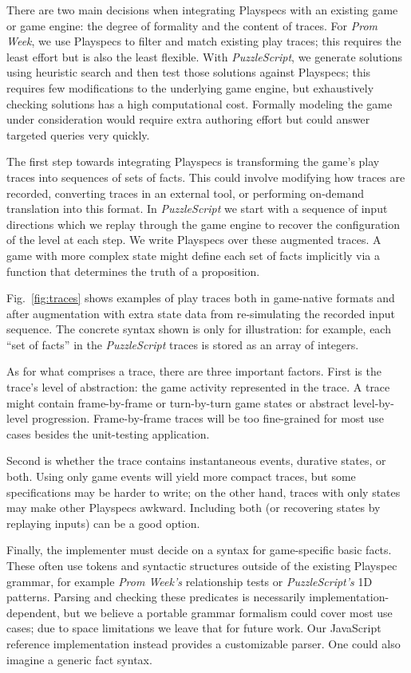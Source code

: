 \documentclass[letterpaper]{article}
\begin{document}
\noindent There are two main decisions when integrating Playspecs with an existing game or game engine: the degree of formality and the content of traces.
For \emph{Prom Week}, we use Playspecs to filter and match existing play traces; this requires the least effort but is also the least flexible. With \emph{PuzzleScript}, we generate solutions using heuristic search and then test those solutions against Playspecs; this requires few modifications to the underlying game engine, but exhaustively checking solutions has a high computational cost.  Formally modeling the game under consideration would require extra authoring effort but could answer targeted queries very quickly.

The first step towards integrating Playspecs is transforming the game's play traces into sequences of sets of facts. This could involve modifying how traces are recorded, converting traces in an external tool, or performing on-demand translation into this format. In \emph{PuzzleScript} we start with a sequence of input directions which we replay through the game engine to recover the configuration of the level at each step. We write Playspecs over these augmented traces. A game with more complex state might define each set of facts implicitly via a function that determines the truth of a proposition.

Fig.~\ref{fig:traces} shows examples of play traces both in game-native formats and after augmentation with extra state data from re-simulating the recorded input sequence. The concrete syntax shown is only for illustration: for example, each ``set of facts'' in the \emph{PuzzleScript} traces is stored as an array of integers.

As for what comprises a trace, there are three important factors. First is the trace's level of abstraction: the game activity represented in the trace. A trace might contain frame-by-frame or turn-by-turn game states or abstract level-by-level progression. Frame-by-frame traces will be too fine-grained for most use cases besides the unit-testing application.

Second is whether the trace contains instantaneous events, durative states, or both. Using only game events will yield more compact traces, but some specifications may be harder to write; on the other hand, traces with only states may make other Playspecs awkward. Including both (or recovering states by replaying inputs) can be a good option. 

Finally, the implementer must decide on a syntax for game-specific basic facts. These often use tokens and syntactic structures outside of the existing Playspec grammar, for example \emph{Prom Week's} relationship tests or \emph{PuzzleScript's} 1D patterns. Parsing and checking these predicates is necessarily implementation-dependent, but we believe a portable grammar formalism could cover most use cases; due to space limitations we leave that for future work. Our JavaScript reference implementation instead provides a customizable parser. One could also imagine a generic fact syntax.
\end{document}
